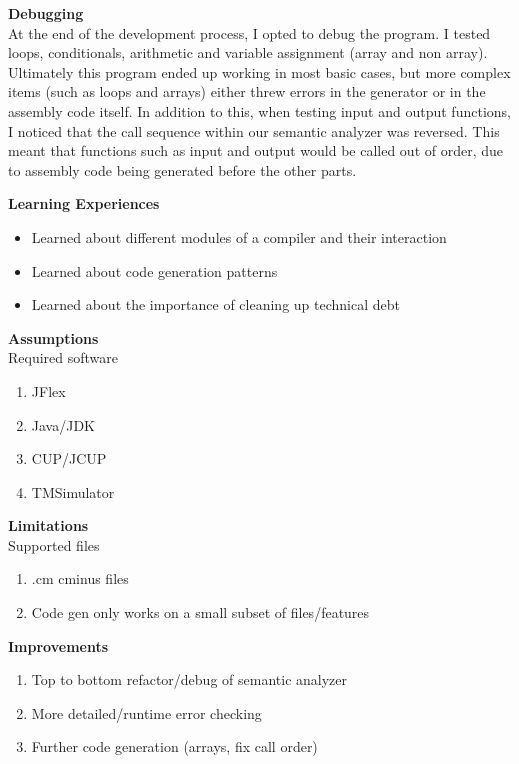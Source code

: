 \documentclass[12pt]{extarticle}
\begin{document}
\textbf{Debugging} \\
At the end of the development process, I opted to debug the program. I tested loops, conditionals, arithmetic and variable assignment (array and non array). Ultimately this program ended up working in most basic cases, but more complex items (such as loops and arrays) either threw errors in the generator or in the assembly code itself. In addition to this, when testing input and output functions, I noticed that the call sequence within our semantic analyzer was reversed. This meant that functions such as input and output would be called out of order, due to assembly code being generated before the other parts.

\textbf{Learning Experiences}
\begin{itemize}
    \item Learned about different modules of a compiler and their interaction
    \item Learned about code generation patterns
    \item Learned about the importance of cleaning up technical debt
\end{itemize}

\begin{multicols}{3}
    \textbf{Assumptions} \\
    Required software
    \begin{enumerate}
        \item JFlex
        \item Java/JDK
        \item CUP/JCUP
        \item TMSimulator
    \end{enumerate}
    \columnbreak
    \textbf{Limitations} \\
    Supported files
    \begin{enumerate}
        \item .cm cminus files
        \item Code gen only works on a small subset of files/features
    \end{enumerate}
    \columnbreak
    \textbf{Improvements}
    \begin{enumerate}
        \item Top to bottom refactor/debug of semantic analyzer
        \item More detailed/runtime error checking
        \item Further code generation (arrays, fix call order)
    \end{enumerate}
\end{multicols}
\end{document}
